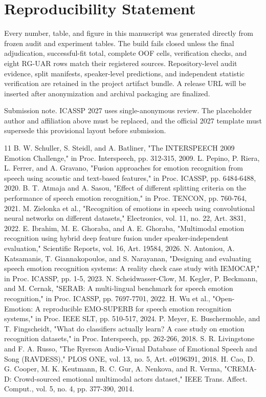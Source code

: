 \documentclass{article}
\begin{document}
\section{Reproducibility Statement}

Every number, table, and figure in this manuscript was generated directly from frozen audit and experiment tables.
The build fails closed unless the final adjudication, successful-fit total, complete OOF cells, verification checks, and eight RG-UAR rows match their registered sources.
Repository-level audit evidence, split manifests, speaker-level predictions, and independent statistic verification are retained in the project artifact bundle.
A release URL will be inserted after anonymization and archival packaging are finalized.

Submission note.
ICASSP 2027 uses single-anonymous review.
The placeholder author and affiliation above must be replaced, and the official 2027 template must supersede this provisional layout before submission.

\begin{thebibliography}{11}
 B.
W.
Schuller, S.
Steidl, and A.
Batliner, "The INTERSPEECH 2009 Emotion Challenge," in Proc.
Interspeech, pp. 312-315, 2009.
 L.
Pepino, P.
Riera, L.
Ferrer, and A.
Gravano, "Fusion approaches for emotion recognition from speech using acoustic and text-based features," in Proc.
ICASSP, pp. 6484-6488, 2020.
 B.
T.
Atmaja and A.
Sasou, "Effect of different splitting criteria on the performance of speech emotion recognition," in Proc.
TENCON, pp. 760-764, 2021.
 M.
Zielonka et al., "Recognition of emotions in speech using convolutional neural networks on different datasets," Electronics, vol. 11, no. 22, Art. 3831, 2022.
 E.
Ibrahim, M.
E.
Ghoraba, and A.
E.
Ghoraba, "Multimodal emotion recognition using hybrid deep feature fusion under speaker-independent evaluation," Scientific Reports, vol. 16, Art. 19584, 2026.
 N.
Antoniou, A.
Katsamanis, T.
Giannakopoulos, and S.
Narayanan, "Designing and evaluating speech emotion recognition systems: A reality check case study with IEMOCAP," in Proc.
ICASSP, pp. 1-5, 2023.
 N.
Scheidwasser-Clow, M.
Kegler, P.
Beckmann, and M.
Cernak, "SERAB: A multi-lingual benchmark for speech emotion recognition," in Proc.
ICASSP, pp. 7697-7701, 2022.
 H.
Wu et al., "Open-Emotion: A reproducible EMO-SUPERB for speech emotion recognition systems," in Proc.
IEEE SLT, pp. 510-517, 2024.
 P.
Meyer, E.
Buschermohle, and T.
Fingscheidt, "What do classifiers actually learn?
A case study on emotion recognition datasets," in Proc.
Interspeech, pp. 262-266, 2018.
 S.
R.
Livingstone and F.
A.
Russo, "The Ryerson Audio-Visual Database of Emotional Speech and Song (RAVDESS)," PLOS ONE, vol. 13, no. 5, Art. e0196391, 2018.
 H.
Cao, D.
G.
Cooper, M.
K.
Keutmann, R.
C.
Gur, A.
Nenkova, and R.
Verma, "CREMA-D: Crowd-sourced emotional multimodal actors dataset," IEEE Trans.
Affect.
Comput., vol. 5, no. 4, pp. 377-390, 2014.
\end{thebibliography}
\end{document}
